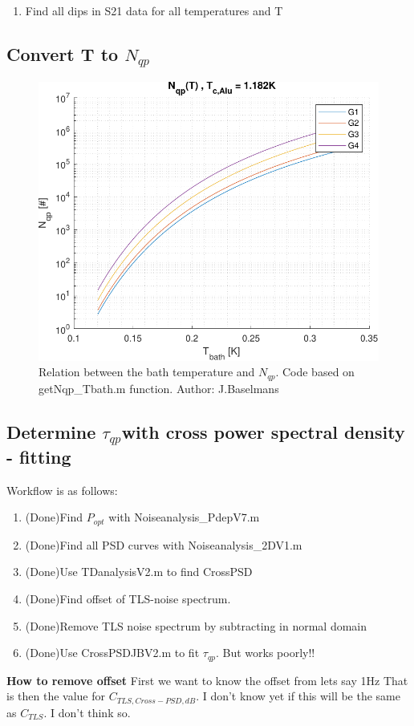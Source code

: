 \begin{enumerate}
	\item Find all dips in S21 data for all temperatures and T
\end{enumerate}


\subsection*{Convert T to $N_{qp}$}

\begin{figure}[ht]
	\centering
	\includegraphics[width=\linewidth]{figures/ch5_measurement/N_qp_funcT.pdf}
	\caption{Relation between the bath temperature and $N_{qp}$. Code based on getNqp\_Tbath.m function. Author: J.Baselmans}
	\label{fig:}
\end{figure}

\subsection*{Determine $\tau_{qp} $with cross power spectral density - fitting}
Workflow is as follows:
\begin{enumerate}
	\item (Done)Find $P_{opt}$ with Noiseanalysis\_PdepV7.m
	\item (Done)Find all PSD curves with Noiseanalysis\_2DV1.m
	\item (Done)Use TDanalysisV2.m to find CrossPSD
	\item (Done)Find offset of TLS-noise spectrum.
	\item (Done)Remove TLS noise spectrum by subtracting in normal domain
	\item (Done)Use CrossPSDJBV2.m to fit $\tau_{qp}$. But works poorly!!
\end{enumerate}
\textbf{How to remove offset}
First we want to know the offset from lets say 1Hz
That is then the value for $C_{TLS,Cross-PSD,dB}$. I don't know yet if this will be the same as $C_{TLS}$. I don't think so. 

